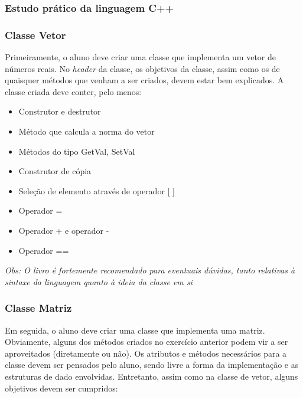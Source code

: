 \documentclass[11pt, oneside, hidelinks]{article}   	%
\begin{document}
\subsubsection{Estudo prático da linguagem C++}
\subsubsection*{Classe Vetor}
Primeiramente, o aluno deve criar uma classe que implementa um vetor de números reais. No \emph{header} da classe, os objetivos da classe, assim como os de quaisquer métodos que venham a ser criados, devem estar bem explicados. A classe criada deve conter, pelo menos:
\begin{samepage}
\begin{itemize}
\item Construtor e destrutor 
\item Método que calcula a norma do vetor 
\item Métodos do tipo GetVal, SetVal 
\item Construtor de cópia 
\item Seleção de elemento através de operador [ ] 
\item Operador = 
\item Operador + e operador -
\item Operador ==
\end{itemize}
\emph{Obs: O livro \citet{deitel12} é fortemente recomendado para eventuais dúvidas, tanto relativas à sintaxe da linguagem quanto à ideia da classe em si}
\end{samepage}
\subsubsection*{Classe Matriz}
Em seguida, o aluno deve criar uma classe que implementa uma matriz. Obviamente, alguns dos métodos criados no exercício anterior podem vir a ser aproveitados (diretamente ou não). Os atributos e métodos necessários para a classe devem ser pensados pelo aluno, sendo livre a forma da implementação e as estruturas de dado envolvidas. Entretanto, assim como na classe de vetor, alguns objetivos devem ser cumpridos:
\newpage
\end{document}
